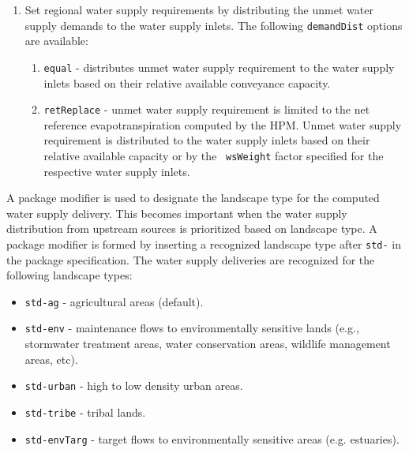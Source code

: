 \begin{enumerate}
 \item Set regional water supply requirements by distributing the
   unmet water supply demands to the water supply inlets. The
   following {\tt demandDist} options are available:

   \begin{enumerate}

   \item {\tt equal} - distributes unmet water supply requirement to
     the water supply inlets based on their relative available
     conveyance capacity.

   \item {\tt retReplace} - unmet water supply requirement is limited
     to the net reference evapotranspiration computed by the HPM.
     Unmet water supply requirement is distributed to the water supply
     inlets based on their relative available capacity or by the {\tt
     wsWeight} factor specified for the respective water supply
     inlets.
     
   \end{enumerate}
\end{enumerate}

A package modifier is used to designate the landscape type for the
computed water supply delivery.  This becomes important when the water
supply distribution from upstream sources is prioritized based on
landscape type.  A package modifier is formed by inserting a
recognized landscape type after {\tt std-} in the package
specification.  The water supply deliveries are recognized for the
following landscape types:

\begin{itemize}

  \item {\tt std-ag} \-- agricultural areas (default).

  \item {\tt std-env} \-- maintenance flows to environmentally
    sensitive lands (e.g., stormwater treatment areas, water
    conservation areas, wildlife management areas, etc).

  \item {\tt std-urban} \-- high to low density urban areas.

  \item {\tt std-tribe} \-- tribal lands.

  \item {\tt std-envTarg} \-- target flows to environmentally sensitive
  areas (e.g. estuaries).

\end{itemize}

